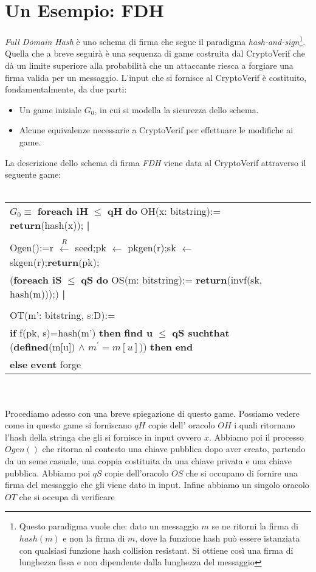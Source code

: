 \documentclass[a4paper,openright,twoside,12pt]{report}
\newcommand{\foreach}[2]{\textbf{foreach #1} $\leq$ \textbf{#2} \textbf{do}}
\newcommand{\return}[1]{\textbf{return}(#1);}
\newcommand{\pipe}{ \textbf{|} \\ \\}
\newcommand{\setR}[2]{#1 $\xleftarrow{R}$ #2;}
\newcommand{\set}[2]{#1 $\leftarrow$ #2;}
\newcommand{\ifthen}[2]{\textbf{if} #1 \textbf{then} #2}
\newcommand{\find}[6]{\textbf{find #1} $\leq$ \textbf{#2 suchthat} (\textbf{defined}(#3) $\wedge$ #4)) \textbf{then} #5 \\ \textbf{else} #6}
\newcommand{\event}{\textbf{event}}
\newcommand{\myend}{\textbf{end}}
\begin{document}
\section{Un Esempio: FDH}
\emph{Full Domain Hash} \`e uno schema di firma che segue il paradigma \emph{hash-and-sign}\footnote{Questo paradigma vuole che: dato un messaggio $m$ se ne ritorni 
la firma di $hash(m)$ e non la firma di $m$, dove la funzione hash pu\`o essere istanziata con qualsiasi funzione hash collision resistant. 
Si ottiene cos\`i una firma di lunghezza fissa e non dipendente dalla lunghezza del messaggio}. 
Quella che a breve seguir\`a \`e una sequenza di game costruita dal CryptoVerif che d\`a un limite superiore alla probabilit\`a che un attaccante riesca a forgiare una firma valida
per un messaggio.\newpage
L'input che si fornisce al CryptoVerif \`e costituito, fondamentalmente, da due parti: 
\begin{itemize}
 \item Un game iniziale $G_0$, in cui si modella la sicurezza dello schema.
 \item Alcune equivalenze necessarie a CryptoVerif per effettuare le modifiche ai game. 
\end{itemize}
La descrizione dello schema di firma \emph{FDH} viene data al CryptoVerif attraverso il seguente game:\\ \\
\begin{tabular}{lcr}
\hline
$G_0 \equiv$ \foreach{iH}{qH} OH(x: bitstring):= \return{hash(x)}\pipe Ogen():=\setR{r}{seed}\set{pk}{pkgen(r)}\set{sk}{skgen(r)}\return{pk}\\
	(\foreach{iS}{qS} OS(m: bitstring):= \return{invf(sk, hash(m))})\pipe
	OT(m': bitstring, s:D):=\\ \ifthen{f(pk, s)=hash(m')}{\find{u}{qS}{m[u]} {$m^{'}=m[u]$} {\myend} {\event} forge}
	\\
\hline 
\end{tabular}\\ \\
Procediamo adesso con una breve spiegazione di questo game.
Possiamo vedere come in questo game si forniscano $qH$ copie dell' oracolo $OH$ i quali ritornano l'hash della stringa che gli si fornisce in input ovvero $x$.
Abbiamo poi il processo $Ogen()$ che ritorna al contesto una chiave pubblica dopo aver creato, partendo da un seme casuale, una coppia costituita da una chiave privata e una chiave pubblica.
Abbiamo poi $qS$ copie dell'oracolo $OS$ che si occupano di fornire una firma del messaggio che gli viene dato in input. Infine abbiamo un singolo oracolo $OT$ che si occupa di verificare
\end{document}
